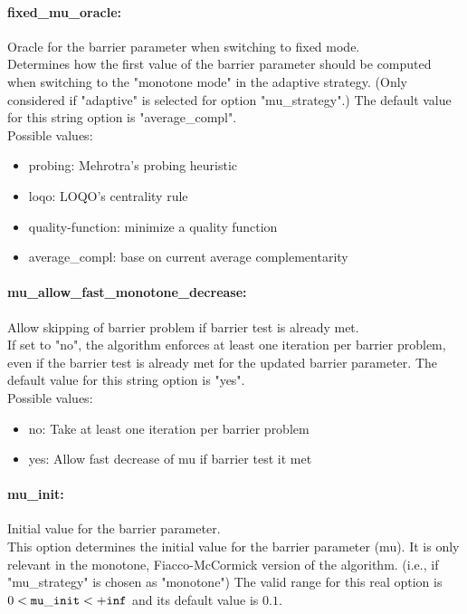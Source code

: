 \paragraph{fixed\_mu\_oracle:}\label{sec:fixed_mu_oracle} Oracle for the barrier parameter when switching to fixed mode. $\;$ \\
 Determines how the first value of the barrier
parameter should be computed when switching to
the "monotone mode" in the adaptive strategy.
(Only considered if "adaptive" is selected for
option "mu\_strategy".)
The default value for this string option is "average\_compl".
\\ 
Possible values:
\begin{itemize}
   \item probing: Mehrotra's probing heuristic
   \item loqo: LOQO's centrality rule
   \item quality-function: minimize a quality function
   \item average\_compl: base on current average complementarity
\end{itemize}

\paragraph{mu\_allow\_fast\_monotone\_decrease:}\label{sec:mu_allow_fast_monotone_decrease} Allow skipping of barrier problem if barrier test is already met. $\;$ \\
 If set to "no", the algorithm enforces at least
one iteration per barrier problem, even if the
barrier test is already met for the updated
barrier parameter.
The default value for this string option is "yes".
\\ 
Possible values:
\begin{itemize}
   \item no: Take at least one iteration per barrier problem
   \item yes: Allow fast decrease of mu if barrier test it met
\end{itemize}

\paragraph{mu\_init:}\label{sec:mu_init} Initial value for the barrier parameter. $\;$ \\
 This option determines the initial value for the
barrier parameter (mu).  It is only relevant in
the monotone, Fiacco-McCormick version of the
algorithm. (i.e., if "mu\_strategy" is chosen as
"monotone") The valid range for this real option is 
$0 <  {\tt mu\_init } <  {\tt +inf}$
and its default value is $0.1$.


